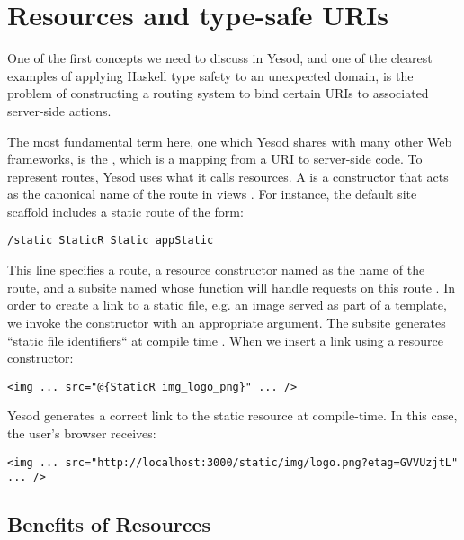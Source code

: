 \section{Resources and type-safe URIs} \label{resourcesAndTSURIs}

One of the first concepts we need to discuss in Yesod, and one of the clearest examples of applying Haskell type safety to an unexpected domain, is the problem of constructing a routing system to bind certain URIs to associated server-side actions.

The most fundamental term here, one which Yesod shares with many other Web frameworks, is the , which is a mapping from a URI to server-side code. To represent routes, Yesod uses what it calls resources. A  is a  constructor that acts as the canonical name of the route in views \cite{ybk}. For instance, the default site scaffold includes a static route of the form:

\begin{Verbatim}[samepage=true]
/static StaticR Static appStatic
\end{Verbatim}

This line specifies a  route, a resource constructor named  as the name of the route, and a subsite named  whose function  will handle requests on this route \cite{ybkRouting}. In order to create a link to a static file, e.g. an image served as part of a template, we invoke the  constructor with an appropriate argument. The  subsite generates ``static file identifiers`` at compile time \cite{ybkScaffolding}. When we insert a link using a resource constructor:

\begin{Verbatim}[samepage=true]
<img ... src="@{StaticR img_logo_png}" ... />
\end{Verbatim}

Yesod generates a correct link to the static resource at compile-time. In this case, the user's browser receives:

\begin{Verbatim}[samepage=true]
<img ... src="http://localhost:3000/static/img/logo.png?etag=GVVUzjtL" ... />
\end{Verbatim}

\subsection{Benefits of Resources}


